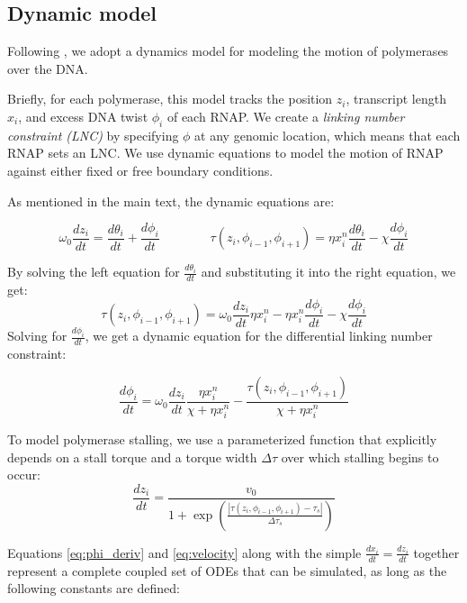 \documentclass[11pt]{article}
\begin{document}
\subsection{Dynamic model}
Following \textcite{sevierPropertiesGeneExpression2018}, we adopt a dynamics model for modeling the motion of polymerases over the DNA.

Briefly, for each polymerase, this model tracks the position \(z_i\), transcript length \(x_i\), and excess DNA twist \(\phi_i\) of each RNAP. We create a \emph{linking number constraint (LNC)} by specifying \(\phi\) at any genomic location, which means that each RNAP sets an LNC. We use dynamic equations to model the motion of RNAP against either fixed or free boundary conditions.

As mentioned in the main text, the dynamic equations are:

\begin{equation}
    \omega_0 \frac{d z_i}{dt} = \frac{d \theta_i}{dt} + \frac{d \phi_i}{dt} \qquad \qquad \tau(z_i, \phi_{i-1}, \phi_{i+1}) = \eta x_i^n \frac{d\theta_i}{dt} - \chi \frac{d\phi_i}{dt}
\end{equation}

By solving the left equation for \(\frac{d \theta_i}{dt}\) and substituting it into the right equation, we get:
\[\tau(z_i, \phi_{i-1}, \phi_{i+1}) = \omega_0 \frac{dz_i}{dt} \eta x_i^n - \eta x_i^n \frac{d\phi_i}{dt} - \chi \frac{d\phi_i}{dt}\]
Solving for \(\frac{d\phi_i}{dt}\), we get a dynamic equation for the differential linking number constraint:

\begin{equation}
    \frac{d\phi_i}{dt} = \omega_0 \frac{dz_i}{dt} \frac{\eta x_i^n}{\chi + \eta x_i^n} - \frac{\tau(z_i, \phi_{i-1}, \phi_{i+1})}{\chi + \eta x_i^n}
\end{equation} \label{eq:phi_deriv}

To model polymerase stalling, we use a parameterized function that explicitly depends on a stall torque and a torque width \(\Delta \tau\) over which stalling begins to occur:
\begin{equation}
    \frac{dz_i}{dt} = \frac{v_0}{1 + \exp\left(\frac{|\tau(z_i, \phi_{i-1}, \phi_{i+1}) - \tau_s|}{\Delta \tau_s}\right)}
\end{equation} \label{eq:velocity}

Equations \ref{eq:phi_deriv} and \ref{eq:velocity} along with the simple \(\frac{dx_i}{dt} = \frac{dz_i}{dt}\) together represent a complete coupled set of ODEs that can be simulated, as long as the following constants are defined:
\end{document}
